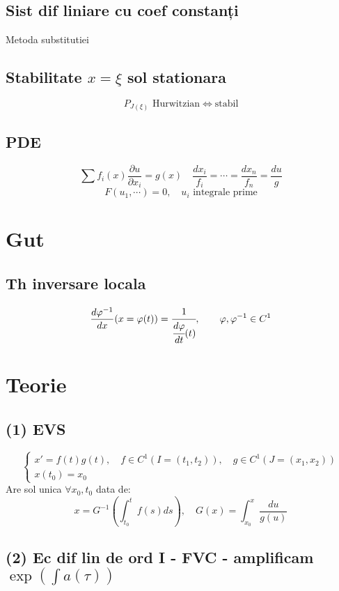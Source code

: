 \documentclass{article}
\newcommand{\parti}[2]{\frac{\partial #1}{ \partial #2}}
\begin{document}
\subsection*{Sist dif liniare cu coef constanți}
Metoda substitutiei

\subsection*{Stabilitate $x = \xi$ sol stationara}

\[P_{J(\xi)} \text{ Hurwitzian} \iff \text{stabil}\]

\subsection*{PDE}

\[ \sum f_i(x) \parti{u}{x_i} = g(x) \quad \frac{dx_i}{f_i} = \cdots = \frac{dx_n}{f_n} = \frac{du}{g} \]
\[ F(u_1,\cdots) = 0, \quad u_i \text{ integrale prime} \]


\section*{Gut}
\subsection*{Th inversare locala}
\[\frac{d\varphi^{-1}}{dx}(x=\varphi(t)) = \cfrac{1}{\cfrac{d\varphi}{dt}(t)}, \quad\quad \varphi, \varphi^{-1} \in C^1\]

\section*{Teorie}

\subsection*{(1) EVS}
  \[
    \begin{cases}
      x'= f(t) g(t), \quad f \in C^1(I = (t_1, t_2)), \quad g \in C^1(J = (x_1, x_2))\\
      x(t_0) = x_0
    \end{cases}
  \]
  Are sol unica $\forall x_0, t_0$ data de:
  \[
    x = G^{-1} \left( \int_{t_0}^{t} f(s)ds \right), \quad G(x) = \int_{x_0}^{x}\frac{du}{g(u)}
  \]
\subsection*{(2) Ec dif lin de ord I - FVC - amplificam $\exp(\int a(\tau))$}
\end{document}
